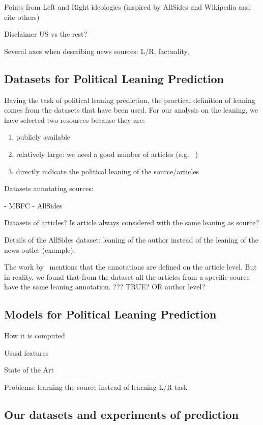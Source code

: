 Points from Left and Right ideologies (inspired by AllSides and Wikipedia and cite others) 

Disclaimer US vs the rest?

Several axes when describing news sources: L/R, factuality, 

\subsection{Datasets for Political Leaning Prediction}

Having the task of political leaning prediction, the practical definition of leaning comes from the datasets that have been used.
For our analysis on the leaning, we have selected two resources because they are:
\begin{enumerate}
    \item publicly available
    \item relatively large: we need a good number of articles (e.g. ~) 
    \item directly indicate the political leaning of the source/articles
\end{enumerate}

Datasets annotating sources:

- MBFC
- AllSides

Datasets of articles? Is article always considered with the same leaning as source?

Details of the AllSides dataset: leaning of the author instead of the leaning of the news outlet (example).

The work by~\cite{baly2020we} mentions that the annotations are defined on the article level. But in reality, we found that from the dataset all the articles from a specific source have the same leaning annotation. ??? TRUE? OR author level?

\subsection{Models for Political Leaning Prediction}

How it is computed

Usual features

State of the Art

Problems: learning the source instead of learning L/R task

\subsection{Our datasets and experiments of prediction}

